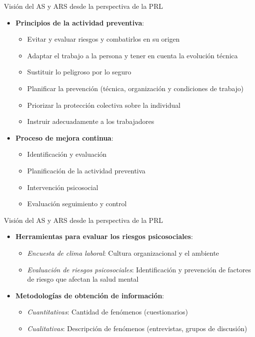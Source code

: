\documentclass{beamer}
\begin{document}
    \begin{frame}{Visión del AS y ARS desde la perspectiva de la PRL}
        \begin{itemize}
            \item \textbf{Principios de la actividad preventiva}:
            \begin{itemize}
                \item Evitar y evaluar riesgos y combatirlos en su origen
                \item Adaptar el trabajo a la persona y tener en cuenta la evolución técnica
                \item Sustituir lo peligroso por lo seguro
                \item Planificar la prevención (técnica, organización y condiciones de trabajo)
                \item Priorizar la protección colectiva sobre la individual
                \item Instruir adecuadamente a los trabajadores
            \end{itemize}
            \item \textbf{Proceso de mejora continua}:
            \begin{itemize}
                \item Identificación y evaluación
                \item Planificación de la actividad preventiva
                \item Intervención psicosocial
                \item Evaluación seguimiento y control
            \end{itemize}
        \end{itemize}
    \end{frame}

    \begin{frame}{Visión del AS y ARS desde la perspectiva de la PRL}
        \begin{itemize}
            \item \textbf{Herramientas para evaluar los riesgos psicosociales}:
            \begin{itemize}
                \item \textit{Encuesta de clima laboral}: Cultura organizacional y el ambiente
                \item \textit{Evaluación de riesgos psicosociales}: Identificación y prevención de factores de riesgo que afectan la salud mental
            \end{itemize}
            \item \textbf{Metodologías de obtención de información}:
            \begin{itemize}
                \item \textit{Cuantitativas}: Cantidad de fenómenos (cuestionarios)
                \item \textit{Cualitativas}: Descripción de fenómenos (entrevistas, grupos de discusión)
            \end{itemize}
        \end{itemize}
    \end{frame}
\end{document}
